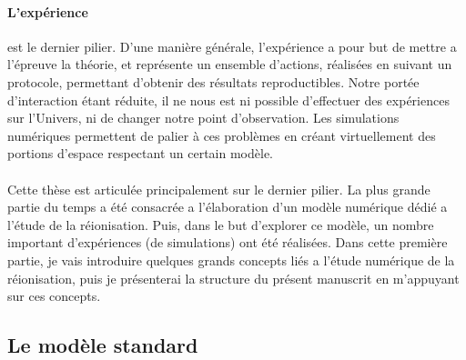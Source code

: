 

\paragraph{L'expérience} est le dernier pilier.
D'une manière générale, l'expérience a pour but de mettre a l’épreuve la théorie, et représente un ensemble d'actions, réalisées en suivant un protocole, permettant d'obtenir des résultats reproductibles.
Notre portée d'interaction étant réduite, il ne nous est ni possible d'effectuer des expériences sur l'Univers, ni de changer notre point d'observation.
Les simulations numériques permettent de palier à ces problèmes en créant virtuellement des portions d'espace respectant un certain modèle.




\paragraph{}


Cette thèse est articulée principalement sur le dernier pilier.
La plus grande partie du temps a été consacrée a l'élaboration d'un modèle numérique dédié a l'étude de la réionisation.
Puis, dans le but d'explorer ce modèle, un nombre important d'expériences (de simulations) ont été réalisées.
Dans cette première partie, je vais introduire quelques grands concepts liés a l'étude numérique de la réionisation, puis je présenterai la structure du présent manuscrit en m'appuyant sur ces concepts.


\subsection*{Le modèle standard}

